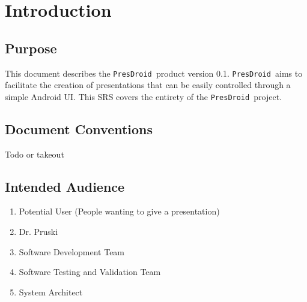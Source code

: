 \documentclass{article}
\newcommand{\pd}{\texttt{PresDroid }}
\begin{document}
\section{Introduction}
\subsection{Purpose}

This document describes the \pd product version 0.1.
\pd aims to facilitate the creation of presentations that can be easily controlled through a simple Android UI. 
This SRS covers the entirety of the \pd project.

\subsection{Document Conventions}

Todo or takeout

\subsection{Intended Audience} %

\begin{enumerate}
\item Potential User (People wanting to give a presentation)
\item Dr. Pruski
\item Software Development Team
\item Software Testing and Validation Team
\item System Architect
\end{enumerate}
\end{document}
